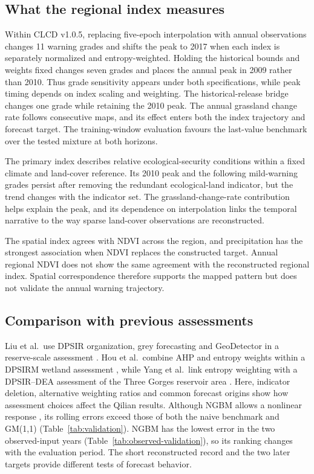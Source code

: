 \documentclass[preprint,11pt,authoryear]{elsarticle}
\begin{document}
\subsection{What the regional index measures}
Within CLCD v1.0.5, replacing five-epoch interpolation with annual observations changes 11 warning grades and shifts the peak to 2017 when each index is separately normalized and entropy-weighted. Holding the historical bounds and weights fixed changes seven grades and places the annual peak in 2009 rather than 2010. Thus grade sensitivity appears under both specifications, while peak timing depends on index scaling and weighting. The historical-release bridge changes one grade while retaining the 2010 peak. The annual grassland change rate follows consecutive maps, and its effect enters both the index trajectory and forecast target. The training-window evaluation favours the last-value benchmark over the tested mixture at both horizons.

The primary index describes relative ecological-security conditions within a fixed climate and land-cover reference. Its 2010 peak and the following mild-warning grades persist after removing the redundant ecological-land indicator, but the trend changes with the indicator set. The grassland-change-rate contribution helps explain the peak, and its dependence on interpolation links the temporal narrative to the way sparse land-cover observations are reconstructed.

The spatial index agrees with NDVI across the region, and precipitation has the strongest association when NDVI replaces the constructed target. Annual regional NDVI does not show the same agreement with the reconstructed regional index. Spatial correspondence therefore supports the mapped pattern but does not validate the annual warning trajectory.

\subsection{Comparison with previous assessments}
Liu et al.\ use DPSIR organization, grey forecasting and GeoDetector in a reserve-scale assessment \citep{liu2023integrated}. Hou et al.\ combine AHP and entropy weights within a DPSIRM wetland assessment \citep{changbai_dpsirm_2024}, while Yang et al.\ link entropy weighting with a DPSIR--DEA assessment of the Three Gorges reservoir area \citep{dpsir_dea_threegorges2023}. Here, indicator deletion, alternative weighting ratios and common forecast origins show how assessment choices affect the Qilian results. Although NGBM allows a nonlinear response \citep{althobaiti_ngbm2022}, its rolling errors exceed those of both the naive benchmark and GM(1,1) (Table~\ref{tab:validation}). NGBM has the lowest error in the two observed-input years (Table~\ref{tab:observed-validation}), so its ranking changes with the evaluation period. The short reconstructed record and the two later targets provide different tests of forecast behavior.
\end{document}
